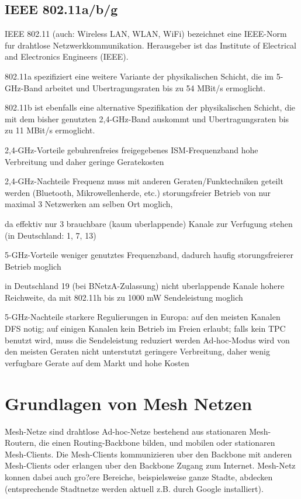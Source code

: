 \subsection{IEEE 802.11a/b/g}

IEEE 802.11 (auch: Wireless LAN, WLAN, WiFi) bezeichnet eine IEEE-Norm
fur drahtlose Netzwerkkommunikation. Herausgeber ist das Institute of
Electrical and Electronics Engineers (IEEE).

802.11a spezifiziert eine weitere Variante der physikalischen Schicht,
die im 5-GHz-Band arbeitet und Ubertragungsraten bis zu 54 MBit/s
ermoglicht. 

802.11b ist ebenfalls eine alternative Spezifikation der physikalischen
Schicht, die mit dem bisher genutzten 2,4-GHz-Band auskommt und
Ubertragungsraten bis zu 11 MBit/s ermoglicht. 

2,4-GHz-Vorteile 
gebuhrenfreies freigegebenes ISM-Frequenzband 
hohe Verbreitung und daher geringe Geratekosten 

2,4-GHz-Nachteile 
Frequenz muss mit anderen Geraten/Funktechniken geteilt werden (Bluetooth,
Mikrowellenherde, etc.) 
storungsfreier Betrieb von nur maximal 3 Netzwerken am selben Ort moglich, 

da effektiv nur 3 brauchbare (kaum uberlappende) Kanale zur Verfugung
stehen (in Deutschland: 1, 7, 13) 

5-GHz-Vorteile 
weniger genutztes Frequenzband, dadurch haufig storungsfreierer Betrieb
moglich 

in Deutschland 19 (bei BNetzA-Zulassung) nicht uberlappende Kanale 
hohere Reichweite, da mit 802.11h bis zu 1000 mW Sendeleistung moglich 

5-GHz-Nachteile 
starkere Regulierungen in Europa: auf den meisten Kanalen DFS notig; 
auf einigen Kanalen kein Betrieb im Freien erlaubt; falls kein TPC
benutzt wird, muss die Sendeleistung reduziert werden 
Ad-hoc-Modus wird von den meisten Geraten nicht unterstutzt 
geringere Verbreitung, daher wenig verfugbare Gerate auf dem Markt und
hohe Kosten 

\section{Grundlagen von Mesh Netzen}

Mesh-Netze sind drahtlose Ad-hoc-Netze bestehend aus stationaren Mesh-Routern, die einen Routing-Backbone bilden, und mobilen oder stationaren Mesh-Clients. Die Mesh-Clients kommunizieren uber den Backbone mit anderen Mesh-Clients oder erlangen uber den Backbone Zugang zum Internet. Mesh-Netz konnen dabei auch gro?ere Bereiche, beispielsweise ganze Stadte, abdecken (entsprechende Stadtnetze werden aktuell z.B. durch Google installiert). 

